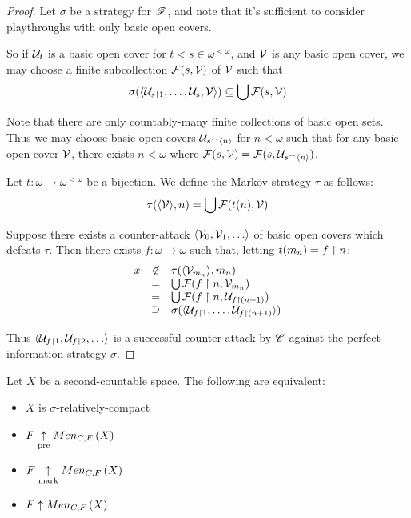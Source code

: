 \begin{proof}
  Let $\sigma$ be a strategy for $\mathscr{F}$, and note that
  it's sufficient to consider playthroughs with only basic open covers.

  So if $\mathcal{U}_t$ is a basic open cover for $t<s\in\omega^{<\omega}$, and
  $\mathcal{V}$ is any basic open cover, we may choose a finite subcollection
  $\mathcal{F}(s,\mathcal{V})$ of $\mathcal{V}$ such that
  \[
    \sigma(\langle\mathcal{U}_{s\restriction 1},\dots,\mathcal{U}_{s},\mathcal{V}\rangle)
      \subseteq
    \bigcup \mathcal{F}(s,\mathcal{V})
  \]

  Note that there are only countably-many finite collections of basic open sets.
  Thus we may choose basic open covers $\mathcal{U}_{s{^\frown}\langle n\rangle}$ for $n<\omega$
  such that for any basic open cover $\mathcal{V}$, there exists $n<\omega$ where
  $\mathcal{F}(s,\mathcal{V})=\mathcal{F}(s,\mathcal{U}_{s{^\frown}\langle n\rangle})$.

  Let $t:\omega\to\omega^{<\omega}$ be a bijection. We define the Mark\"ov
  strategy $\tau$ as follows:
  \[
    \tau(\langle\mathcal{V}\rangle, n)
      =
    \bigcup \mathcal{F}(t(n),\mathcal{V})
  \]

  Suppose there exists a counter-attack $\<\mc V_0,\mc V_1,\dots\>$ of
  basic open covers which defeats $\tau$. Then there exists
  $f:\omega\to\omega$ such that, letting $t(m_n)=f\restriction n$:
  \[
    \begin{array}{rcl}
    x & \not\in & \tau(\langle\mathcal{V}_{m_n}\rangle,m_n) \\
    & = & \bigcup\mathcal{F}(f\restriction n,\mathcal{V}_{m_n}) \\
    & = & \bigcup\mathcal{F}(f\restriction n,\mathcal{U}_{f\restriction (n+1)}) \\
    & \supseteq & \sigma(\langle\mathcal{U}_{f\restriction 1},\dots,\mathcal{U}_{f\restriction(n+1)}\rangle)
    \end{array}
  \]

  Thus $\<\mc U_{f\rest 1}, \mc U_{f\rest 2},\dots\>$ is a successful
  counter-attack by $\mathscr{C}$ against the perfect information strategy $\sigma$.
\end{proof}

\begin{cor}
  Let $X$ be a second-countable space. The following are equivalent:
  \begin{itemize}
    \item $X$ is $\sigma$-relatively-compact
    \item $F \underset{\text{pre}}{\uparrow} Men_{C,F}\left({X}\right)$
    \item $F \underset{\text{mark}}{\uparrow} Men_{C,F}\left({X}\right)$
    \item $F \uparrow Men_{C,F}\left({X}\right)$
  \end{itemize}
\end{cor}

